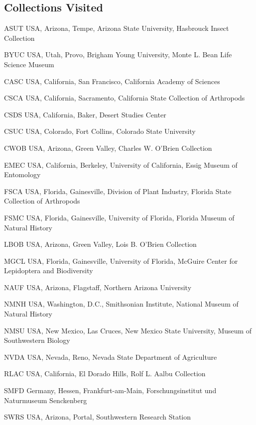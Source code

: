 \documentclass[12pt,a4paper]{article}
\begin{document}
	\subsection*{Collections Visited}
		\begin{collections}
			\item [ASUT] USA, Arizona, Tempe, Arizona State University, Hasbrouck Insect Collection
			\item [BYUC] USA, Utah, Provo, Brigham Young University, Monte L. Bean Life Science Museum
			\item [CASC] USA, California, San Francisco, California Academy of Sciences
			\item [CSCA] USA, California, Sacramento, California State Collection of Arthropods
			\item [CSDS] USA, California, Baker, Desert Studies Center
			\item [CSUC] USA, Colorado, Fort Collins, Colorado State University
			\item [CWOB] USA, Arizona, Green Valley, Charles W. O'Brien Collection
			\item [EMEC] USA, California, Berkeley, University of California, Essig Museum of Entomology
			\item [FSCA] USA, Florida, Gainesville, Division of Plant Industry, Florida State Collection of Arthropods
			\item [FSMC] USA, Florida, Gainesville, University of Florida, Florida Museum of Natural History
			\item [LBOB] USA, Arizona, Green Valley, Lois B. O'Brien Collection
			\item [MGCL] USA, Florida, Gainesville, University of Florida, McGuire Center for Lepidoptera and Biodiversity
			\item [NAUF] USA, Arizona, Flagstaff, Northern Arizona University
			\item [NMNH] USA, Washington, D.C., Smithsonian Institute, National Museum of Natural History
			\item [NMSU] USA, New Mexico, Las Cruces, New Mexico State University, Museum of Southwestern Biology
			\item [NVDA] USA, Nevada, Reno, Nevada State Department of Agriculture
			\item [RLAC] USA, California, El Dorado Hills, Rolf L. Aalbu Collection
			\item [SMFD] Germany, Hessen, Frankfurt-am-Main, Forschungsinstitut und Naturmuseum Senckenberg
			\item [SWRS] USA, Arizona, Portal, Southwestern Research Station

\end{collections}
\end{document}
